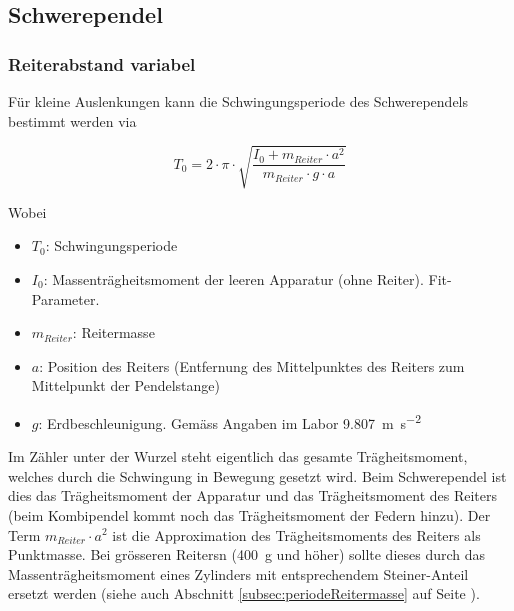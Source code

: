 \subsection{Schwerependel}
\label{subsec:theorie:schwerependel}

\subsubsection{Reiterabstand variabel}
\label{subsec:schwerependel:reitervar}
F\"ur kleine Auslenkungen kann die Schwingungsperiode des Schwerependels bestimmt werden via

\begin{equation}
    T_0 = 2 \cdot \pi \cdot \sqrt{\frac{I_0 + m_{Reiter} \cdot a^2}{m_{Reiter} \cdot g \cdot a}}
\end{equation}

Wobei

\begin{itemize}
    \item
        $T_0$: Schwingungsperiode
    \item
        $I_0$: Massentr\"agheitsmoment der leeren Apparatur (ohne Reiter). Fit-Parameter.
    \item
        $m_{Reiter}$: Reitermasse
    \item
        $a$: Position des Reiters (Entfernung des Mittelpunktes des Reiters zum Mittelpunkt der Pendelstange)
    \item
        $g$: Erdbeschleunigung. Gem\"ass Angaben im Labor \SI{9.807}{\meter\per\second\squared}
\end{itemize}

Im Z\"ahler unter  der Wurzel steht eigentlich  das gesamte Tr\"agheitsmoment,
welches  durch die  Schwingung  in Bewegung  gesetzt wird. Beim  Schwerependel
ist  dies  das  Tr\"agheitsmoment  der  Apparatur  und  das  Tr\"agheitsmoment
des   Reiters  (beim   Kombipendel  kommt   noch  das   Tr\"agheitsmoment  der
Federn  hinzu). Der   Term  $m_{Reiter}  \cdot  a^2$   ist  die  Approximation
des   Tr\"agheitsmoments   des   Reiters   als   Punktmasse. Bei   gr\"osseren
Reitersn   (\SI{400}{\gram}    und   h\"oher)   sollte   dieses    durch   das
Massentr\"agheitsmoment  eines  Zylinders  mit  entsprechendem  Steiner-Anteil
ersetzt werden (siehe auch Abschnitt \ref{subsec:periodeReitermasse} auf Seite
\pageref{subsec:periodeReitermasse}).


